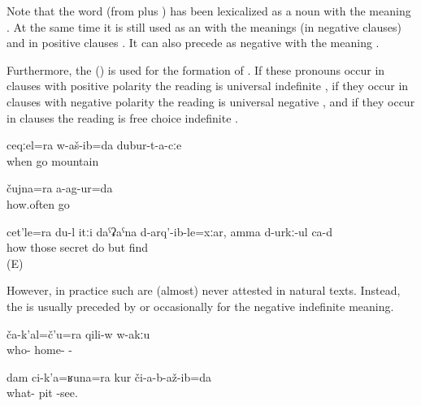 Note that the word  (from   plus ) has been lexicalized as a noun with the meaning . At the same time it is still used as an  with the meanings  (in negative clauses) and  in positive clauses . It can also precede  as negative  with the meaning .

Furthermore, the   () is used for the formation of . If these pronouns occur in clauses with positive polarity the reading is universal indefinite , if they occur in clauses with negative polarity the reading is universal negative , and if they occur in  clauses the reading is free choice indefinite .
%
\begin{exe}
	\ex	\label{ex:I always went through the mountains}
	\gll	ceqːel=ra	w-aš-ib=da	dubur-t-a-cːe\\
		when	go	mountain\\
	\glt	{}

	\ex	\label{ex:I did not go even once.1}
	\gll	čujna=ra	a-ag-ur=da\\
		how.often	go\\
	\glt	{}

	\ex	\label{ex:However I hide them, (they always) find them}
	\gll	cet'le=ra	du-l	itːi	daˁʡaˁna	d-arq'-ib-le=xːar, amma d-urkː-ul ca-d\\
		how		those	secret	do	but	find \\
	\glt	{} (E)
\end{exe}

However, in practice such  are (almost) never attested in natural texts. Instead, the   is usually preceded by   or occasionally   for the negative indefinite meaning.
%
\begin{exe}
	\ex	\label{ex:Nobody is at home}
	\gll	ča-k'al=č'u=ra	qili-w	w-akːu\\
		who-	home-\tsc{m}	-\\
	\glt	{}

	\ex	\label{ex:I do not see any pit}
	\gll	dam	ci-k'a=ʁuna=ra	kur	či-a-b-až-ib=da\\
			what-	pit	-see.\\
	\glt	{}
\end{exe}

